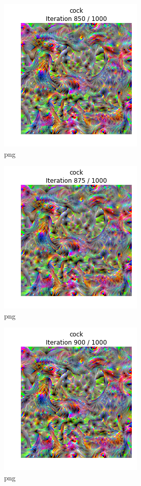 \documentclass[]{book}
\theoremstyle{definition}
\theoremstyle{definition}
\theoremstyle{definition}
\theoremstyle{remark}
\begin{document}
\begin{figure}
\centering
\includegraphics{Network-Visualization-TensorFlow_files/Network-Visualization-TensorFlow_22_34.png}
\caption{png}
\end{figure}

\begin{figure}
\centering
\includegraphics{Network-Visualization-TensorFlow_files/Network-Visualization-TensorFlow_22_35.png}
\caption{png}
\end{figure}

\begin{figure}
\centering
\includegraphics{Network-Visualization-TensorFlow_files/Network-Visualization-TensorFlow_22_36.png}
\caption{png}
\end{figure}
\end{document}
